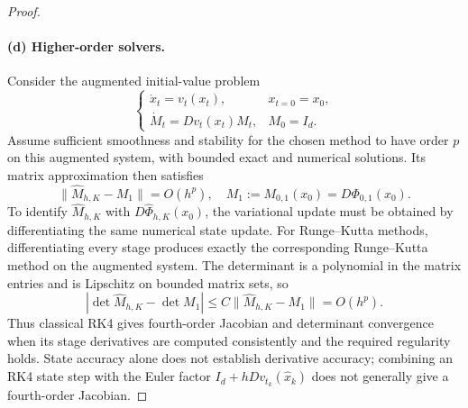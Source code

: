 \documentclass[12pt,a4paper,oneside]{book}
\begin{document}
\begin{proof}
\paragraph{(d) Higher-order solvers.}
Consider the augmented initial-value problem
\begin{equation*}
    \begin{cases}
        \dot x_t=v_t(x_t),&x_{t=0}=x_0,\\
        \dot M_t=Dv_t(x_t)M_t,&M_0=I_d.
    \end{cases}
\end{equation*}
Assume sufficient smoothness and stability for the chosen method to have order $p$ on this augmented system,
with bounded exact and numerical solutions. Its matrix approximation then satisfies
\begin{equation*}
    \|\widehat M_{h,K}-M_1\|=O(h^p),\quad M_1:=M_{0,1}(x_0)=D\Phi_{0,1}(x_0).
\end{equation*}
To identify $\widehat M_{h,K}$ with $D\widehat\Phi_{h,K}(x_0)$, the variational update must be obtained by
differentiating the same numerical state update. For Runge--Kutta methods, differentiating every stage
produces exactly the corresponding Runge--Kutta method on the augmented system.
The determinant is a polynomial in the matrix entries and is Lipschitz on bounded matrix sets, so
\begin{equation*}
    |\det\widehat M_{h,K}-\det M_1|
    \le C\|\widehat M_{h,K}-M_1\|=O(h^p).
\end{equation*}
Thus classical RK4 gives fourth-order Jacobian and determinant convergence when its stage derivatives
are computed consistently and the required regularity holds.
State accuracy alone does not establish derivative accuracy; combining an RK4 state step
with the Euler factor $I_d+hDv_{t_k}(\widehat x_k)$ does not generally give a fourth-order Jacobian.
\end{proof}
\end{document}
